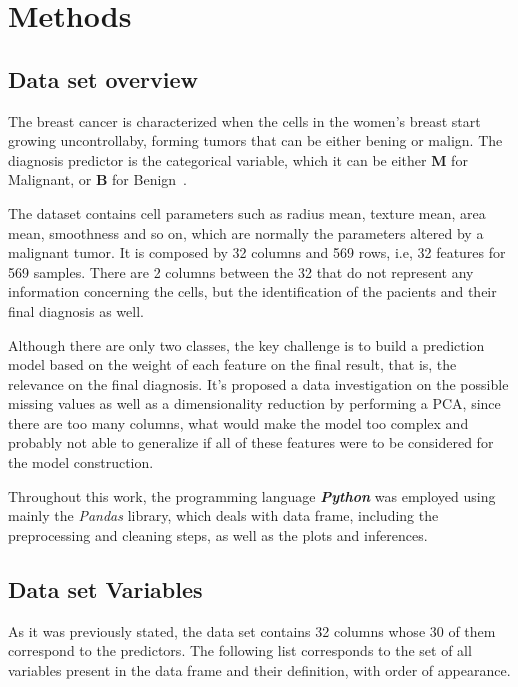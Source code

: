 \documentclass[conference]{IEEEtran}
\begin{document}
\section{Methods}
\subsection{Data set overview}

The breast cancer is characterized when the cells in the women's breast start growing uncontrollaby, forming tumors that can be either bening or malign. The diagnosis predictor is the categorical variable, which it can be either \textbf{M} for Malignant, or \textbf{B} for Benign~\cite{Street1993}.

The dataset contains cell parameters such as radius mean, texture mean, area mean, smoothness and so on, which are normally the parameters altered by a malignant tumor. It is composed by 32 columns and 569 rows, i.e, 32 features for 569 samples. There are 2 columns between the 32 that do not represent any information concerning the cells, but the identification of the pacients and their final diagnosis as well. 

Although there are only two classes, the key challenge is to build a prediction model based on the weight of each feature on the final result, that is, the relevance on the final diagnosis. It's proposed a data investigation on the possible missing values as 
well as a dimensionality reduction by performing a PCA, 
since there are too many columns, what would make the model too complex and probably not able 
to generalize if all of these features were to be considered for the model construction. 

Throughout this work, the programming language \textit{\textbf{Python}} was employed 
using mainly the \textit{Pandas} library, which deals with data frame, including the 
preprocessing and cleaning steps, as well as the plots and inferences. 


\subsection{Data set Variables}

As it was previously stated, the data set contains 32 columns whose 30 of them 
correspond to the predictors. The following list corresponds to the set of all 
variables present in the data frame and their definition, with order of appearance. 
\end{document}
